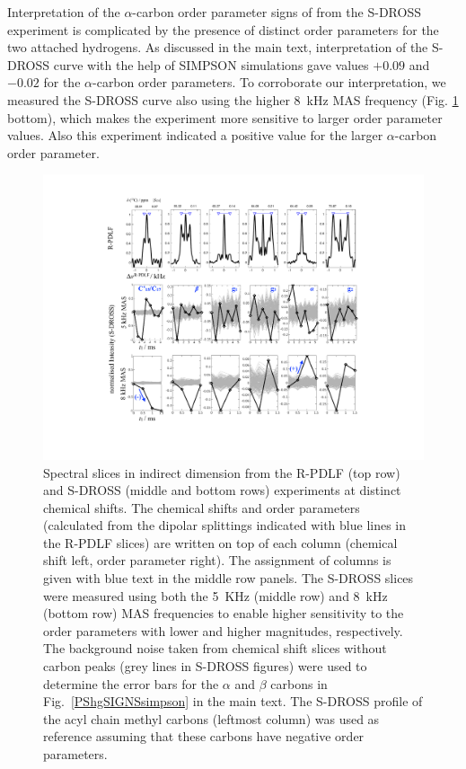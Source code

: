 \documentclass[journal=jpcbfk,manuscript=article]{achemso}
\begin{document}
Interpretation of the $\alpha$-carbon order parameter signs of from the S-DROSS experiment
is complicated by the presence of distinct order parameters for the two attached hydrogens.
As discussed in the main text, interpretation of the S-DROSS curve with the help of SIMPSON
simulations gave values $+0.09$ and $-0.02$ for the $\alpha$-carbon order parameters.
To corroborate our interpretation, we measured the S-DROSS curve also using the higher 8~kHz
MAS frequency (Fig. \ref{DPslices} bottom), which makes the experiment more sensitive to larger order parameter values.
Also this experiment indicated a positive value for the larger $\alpha$-carbon order parameter.
\begin{figure}[]
  \includegraphics[width=\textwidth]{../Figs/SI_man.pdf}
  \caption{\label{DPslices}
    Spectral slices in indirect dimension from the R-PDLF (top row) and S-DROSS (middle and bottom rows) experiments at distinct chemical shifts.
    The chemical shifts and order parameters (calculated from the dipolar splittings indicated with blue lines in the R-PDLF slices)
    are written on top of each column (chemical shift left, order parameter right).
    The assignment of columns is given with blue text in the middle row panels.  
    The S-DROSS slices were measured using both the 5~KHz (middle row) and 8~kHz (bottom row) MAS frequencies to enable
    higher sensitivity to the order parameters with lower and higher magnitudes, respectively.
    The background noise taken from chemical shift slices without carbon peaks (grey lines in S-DROSS figures)
    were used to determine the error bars for the $\alpha$ and $\beta$ carbons in Fig.~\ref{PShgSIGNSsimpson} in the main text.
    The S-DROSS profile of the acyl chain methyl carbons (leftmost column) was used as reference assuming that these carbons have negative order parameters.
  }
\end{figure}
\end{document}

